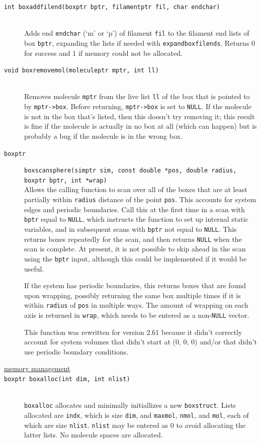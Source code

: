 \documentclass {scrbook}
\newcommand {\ttt} {\texttt}
\begin{document}
\begin{description}
\item[\ttt{int boxaddfilend(boxptr bptr, filamentptr fil, char endchar)}] %
\hfill \\
Adds end \ttt{endchar} (`m' or `p') of filament \ttt{fil} to the filament end lists of box \ttt{bptr}, expanding the lists if needed with \ttt{expandboxfilends}. Returns 0 for success and 1 if memory could not be allocated.

\item[\ttt{void boxremovemol(moleculeptr mptr, int ll)}]
\hfill \\
Removes molecule \ttt{mptr} from the live list \ttt{ll} of the box that is pointed to by \ttt{mptr->box}. Before returning, \ttt{mptr->box} is set to \ttt{NULL}. If the molecule is not in the box that's listed, then this doesn't try removing it; this result is fine if the molecule is actually in no box at all (which can happen) but is probably a bug if the molecule is in the wrong box.

\item[\ttt{boxptr}]
\ttt{boxscansphere(simptr sim, const double *pos, double radius, boxptr bptr, int *wrap)}
\hfill \\
Allows the calling function to scan over all of the boxes that are at least partially within \ttt{radius} distance of the point \ttt{pos}. This accounts for system edges and periodic boundaries. Call this at the first time in a scan with \ttt{bptr} equal to \ttt{NULL}, which instructs the function to set up internal static variables, and in subsequent scans with \ttt{bptr} not equal to \ttt{NULL}. This returns boxes repeatedly for the scan, and then returns \ttt{NULL} when the scan is complete. At present, it is not possible to skip ahead in the scan using the \ttt{bptr} input, although this could be implemented if it would be useful.

If the system has periodic boundaries, this returns boxes that are found upon wrapping, possibly returning the same box multiple times if it is within \ttt{radius} of \ttt{pos} in multiple ways. The amount of wrapping on each axis is returned in \ttt{wrap}, which needs to be entered as a non-\ttt{NULL} vector.

This function was rewritten for version 2.61 because it didn't correctly account for system volumes that didn't start at (0, 0, 0) and/or that didn't use periodic boundary conditions.

\item[\underline{memory management}]

\item[\ttt{boxptr boxalloc(int dim, int nlist)}]
\hfill \\
\ttt{boxalloc} allocates and minimally initiallizes a new \ttt{boxstruct}. Lists allocated are \ttt{indx}, which is size \ttt{dim}, and \ttt{maxmol}, \ttt{nmol}, and \ttt{mol}, each of which are size \ttt{nlist}. \ttt{nlist} may be entered as 0 to avoid allocating the latter lists. No molecule spaces are allocated.


\end{description}
\end{document}
